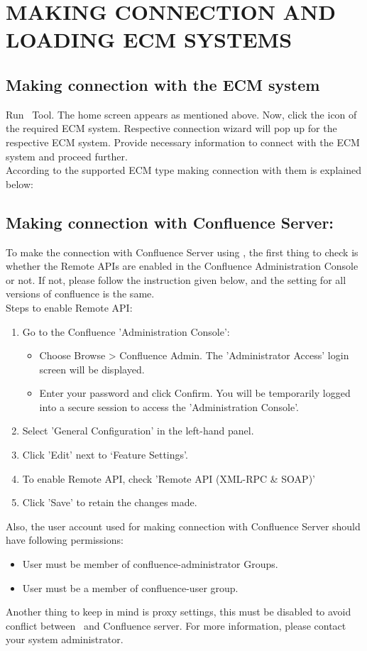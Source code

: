\section{MAKING CONNECTION AND LOADING ECM SYSTEMS}
\subsection{Making connection with the ECM system}
Run \appName\ Tool. The home screen appears as mentioned above. Now, click the icon of the required ECM system. Respective connection wizard will pop up for the respective ECM system. Provide necessary information to connect with the ECM system and proceed further.\\
According to the supported ECM type making connection with them is explained below:
\subsection*{Making connection with Confluence Server:}
To make the connection with Confluence Server using \appName, the first thing to check is whether the Remote APIs are enabled in the Confluence Administration Console or not. If not, please follow the instruction given below, and the setting for all versions of confluence is the same.\\
Steps to enable Remote API:
\begin{enumerate}
	\item Go to the Confluence 'Administration Console':
	\begin{itemize}
		\item Choose Browse > Confluence Admin. The 'Administrator Access' login screen will be displayed.
		\item Enter your password and click Confirm. You will be temporarily logged into a secure session to access the 'Administration Console'.		
	\end{itemize}
	\item Select 'General Configuration' in the left-hand panel.
	\item Click 'Edit' next to ‘Feature Settings’.
	\item To enable Remote API, check 'Remote API (XML-RPC \& SOAP)'
	\item Click 'Save' to retain the changes made.
\end{enumerate}
	Also, the user account used for making connection with Confluence Server should have following permissions:
	\begin{itemize}
		\item User must be member of confluence-administrator Groups.
		\item User must be a member of confluence-user group.
	\end{itemize}
Another thing to keep in mind is proxy settings, this must be disabled to avoid conflict between \appName\ and Confluence server. For more information, please contact your system administrator.
